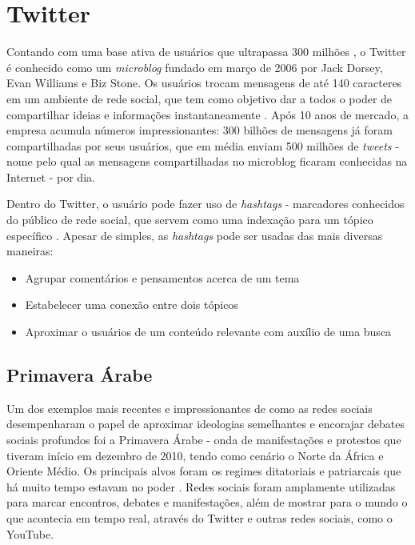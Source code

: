 \section{Twitter}\label{sec:twitter}

Contando com uma base ativa de usuários que ultrapassa 300 milhões \cite{twittercompany2016}, o Twitter é conhecido como um \emph{microblog} fundado em março de 2006 por Jack Dorsey, Evan Williams e Biz Stone. Os usuários trocam mensagens de até 140 caracteres \cite{twittercharlimit2016} em um ambiente de rede social, que tem como objetivo dar a todos o poder de compartilhar ideias e informações instantaneamente \cite{twittercompany2016}. Após 10 anos de mercado, a empresa acumula números impressionantes: 300 bilhões de mensagens já foram compartilhadas por seus usuários, que em média enviam 500 milhões de \emph{tweets} \cite{twitterstats2016} - nome pelo qual as mensagens compartilhadas no microblog ficaram conhecidas na Internet - por dia.

Dentro do Twitter, o usuário pode fazer uso de \emph{hashtags} - marcadores conhecidos do público de rede social, que servem como uma indexação para um tópico específico \cite{waite2012paperback}. Apesar de simples, as \emph{hashtags} pode ser usadas das mais diversas maneiras:
\begin{itemize}
\item Agrupar comentários e pensamentos acerca de um tema
\item Estabelecer uma conexão entre dois tópicos
\item Aproximar o usuários de um conteúdo relevante com auxílio de uma busca
\end{itemize}

\subsection{Primavera Árabe}
Um dos exemplos mais recentes e impressionantes de como as redes sociais desempenharam o papel de aproximar ideologias semelhantes e encorajar debates sociais profundos foi a Primavera Árabe - onda de manifestações e protestos que tiveram início em dezembro de 2010, tendo como cenário o Norte da África e Oriente Médio. Os principais alvos foram os regimes ditatoriais e patriarcais que há muito tempo estavam no poder \cite{howard2011opening}. Redes sociais foram amplamente utilizadas para marcar encontros, debates e manifestações, além de mostrar para o mundo o que acontecia em tempo real, através do Twitter e outras redes sociais, como o YouTube.

